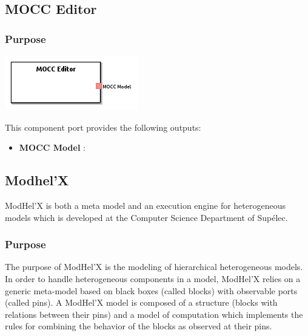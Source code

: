 \documentclass{gemoc} %
\begin{document}
\subsection{MOCC Editor}


\subsubsection{Purpose}


\begin{center}
\includegraphics*[trim=0.0cm 0.0cm 0cm 0.0cm, clip=true]{../images/generated/Generated_MOCC_Editor.png}
\end{center}


This component port provides the following outputs:
\begin{itemize}
  \item \textbf{MOCC Model} :
\end{itemize}


\subsection{Modhel'X}
ModHel'X is both a meta model and an execution engine for heterogeneous models which is developed at the Computer Science Department of Sup\'elec.


\subsubsection{Purpose}
The purpose of ModHel'X is the modeling of hierarchical heterogeneous models. In order to handle heterogeneous components in a model, ModHel'X relies on a generic meta-model based on black boxes (called blocks) with observable ports (called pins). A ModHel'X model is composed of a structure (blocks with relations between their pins) and a model of computation which implements the rules for combining the behavior of the blocks as observed at their pins.
\end{document}
